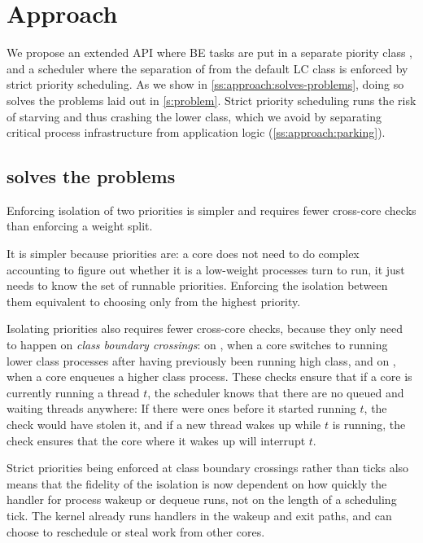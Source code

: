 \section{Approach}\label{s:approach}

We propose an extended \cgroups{} API where BE tasks are put in a separate
piority class \beclass{}, and a scheduler where the separation of \beclass{}
from the default LC class is enforced by strict priority scheduling. As we show
in \autoref{ss:approach:solves-problems}, doing so solves the problems laid out
in \autoref{s:problem}. Strict priority scheduling runs the risk of starving and
thus crashing the lower class, which we avoid by separating critical process
infrastructure from application logic (\autoref{ss:approach:parking}).

\subsection{\beclass{} solves the problems}\label{ss:approach:solves-problems}

Enforcing isolation of two priorities is simpler and requires fewer cross-core
checks than enforcing a weight split. 

It is simpler because priorities are: a core does not need to do complex
accounting to figure out whether it is a low-weight processes turn to run, it
just needs to know the set of runnable priorities. Enforcing the isolation
between them equivalent to choosing only from the highest priority.

Isolating priorities also requires fewer cross-core checks, because they only
need to happen on \textit{class boundary crossings}: on \exit{}, when a core
switches to running lower class processes after having previously been running
high class, and on \entry{}, when a core enqueues a higher class process. These
checks ensure that if a core is currently running a \beclass{} thread $t$, the
scheduler knows that there are no queued and waiting \normalclass{} threads
anywhere: If there were ones before it started running $t$, the \exit{} check
would have stolen it, and if a new \normalclass{} thread wakes up while $t$ is
running, the \entry{} check ensures that the core where it wakes up will
interrupt $t$.

Strict priorities being enforced at class boundary crossings rather than ticks
also means that the fidelity of the isolation is now dependent on how quickly
the handler for process wakeup or dequeue runs, not on the length of a
scheduling tick. The kernel already runs handlers in the wakeup and exit paths,
and can choose to reschedule or steal work from other cores. 

